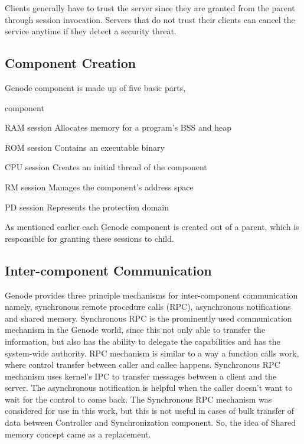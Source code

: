 Clients generally have to trust the server since they are granted from the parent through session invocation. Servers that do not trust their clients can cancel the service anytime if they detect a security threat.

 
\subsection{Component Creation}
Genode component is made up of five basic parts, 

\begin{labeling}{component}
\item[RAM session] Allocates memory for a program's BSS and heap
\item[ROM session] Contains an executable binary
\item[CPU session] Creates an initial thread of the component
\item[RM session] Manages the component's address space 
\item[PD session] Represents the protection domain
\end{labeling}

As mentioned earlier each Genode component is created out of a parent, which is responsible for granting these sessions to child. 

\subsection{Inter-component Communication}\label{Foundations:icc}
Genode provides three principle mechanisms for inter-component communication namely, synchronous remote procedure calls (RPC), asynchronous notifications and shared memory. Synchronous RPC is the prominently used communication mechanism in the Genode world, since this not only able to transfer the information, but also has the ability to delegate the capabilities and has the system-wide authority. 
RPC mechanism is similar to a way a function calls work, where control transfer between caller and callee happens. Synchronous RPC mechanism uses kernel's IPC to transfer messages between a client and the server. The asynchronous notification is helpful when the caller doesn't want to wait for the control to come back. The Synchronous RPC mechanism was considered for use in this work, but this is not useful in cases of bulk transfer of data between Controller and Synchronization component. So, the idea of Shared memory concept came as a replacement.

